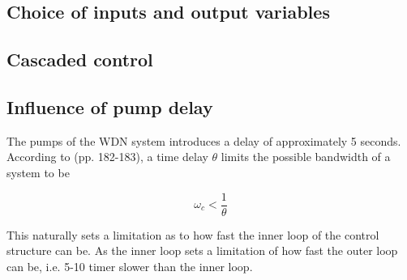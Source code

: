 \subsection{Choice of inputs and output variables}

\subsection{Cascaded control}

\subsection{Influence of pump delay}
The pumps of the WDN system introduces a delay of approximately 5 seconds. According to \cite{Skogestad2005} (pp. 182-183), 
a time delay $\theta$ limits the possible bandwidth of a system to be 

\begin{equation}\label{eq:BWdelay}
	\omega_c < \frac{1}{\theta}
\end{equation}

This naturally sets a limitation as to how fast the inner loop of the control structure can be. As the inner loop sets a limitation of how fast the outer loop can be, i.e. 5-10 timer slower than the inner loop.

